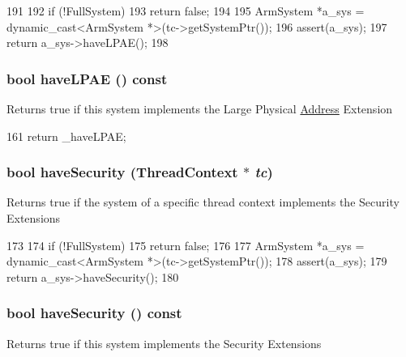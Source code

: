 \begin{DoxyCode}
191 {
192     if (!FullSystem)
193         return false;
194 
195     ArmSystem *a_sys = dynamic_cast<ArmSystem *>(tc->getSystemPtr());
196     assert(a_sys);
197     return a_sys->haveLPAE();
198 }
\end{DoxyCode}
\hypertarget{classArmSystem_a39b5e5d6cff3c8f5a248143a702d8f1a}{
\subsubsection[{haveLPAE}]{\setlength{\rightskip}{0pt plus 5cm}bool haveLPAE () const}}
\label{classArmSystem_a39b5e5d6cff3c8f5a248143a702d8f1a}
Returns true if this system implements the Large Physical \hyperlink{classAddress}{Address} Extension 


\begin{DoxyCode}
161 { return _haveLPAE; }
\end{DoxyCode}
\hypertarget{classArmSystem_abe179837e5b071fc8f9d6896bd7ff1e6}{
\subsubsection[{haveSecurity}]{\setlength{\rightskip}{0pt plus 5cm}bool haveSecurity ({\bf ThreadContext} $\ast$ {\em tc})}}
\label{classArmSystem_abe179837e5b071fc8f9d6896bd7ff1e6}
Returns true if the system of a specific thread context implements the Security Extensions 


\begin{DoxyCode}
173 {
174     if (!FullSystem)
175         return false;
176 
177     ArmSystem *a_sys = dynamic_cast<ArmSystem *>(tc->getSystemPtr());
178     assert(a_sys);
179     return a_sys->haveSecurity();
180 }
\end{DoxyCode}
\hypertarget{classArmSystem_ae08900555a461016d6648524cba6e74c}{
\subsubsection[{haveSecurity}]{\setlength{\rightskip}{0pt plus 5cm}bool haveSecurity () const}}
\label{classArmSystem_ae08900555a461016d6648524cba6e74c}
Returns true if this system implements the Security Extensions 


